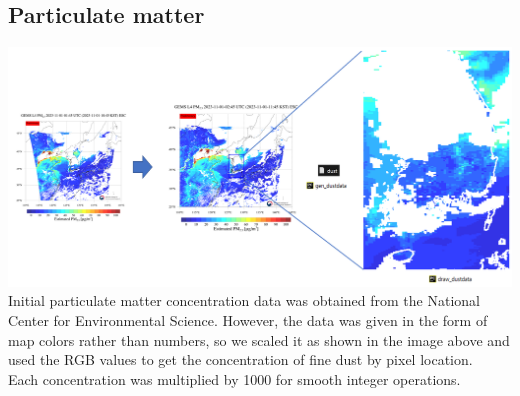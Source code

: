     \subsection{Particulate matter}
        \includegraphics[scale = 0.7]{particulatematter.png}\\
        Initial particulate matter concentration data was obtained from the National Center for Environmental Science. However, the data was given in the form of map colors rather than numbers, so we scaled it as shown in the image above and used the RGB values to get the concentration of fine dust by pixel location.\\
        Each concentration was multiplied by 1000 for smooth integer operations.